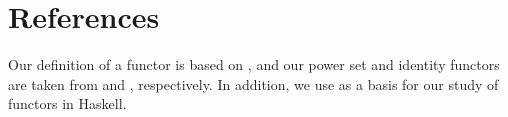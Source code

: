 \section{References}
\label{sec:functors-references}

Our definition of a functor is based on
\parencites[13]{maclane-1998}[428]{poigne-1992}, and our power set and
identity functors are taken from \parencites[431]{poigne-1992} and
\parencite[11]{marquis-2013}, respectively. In addition, we use
\parencites[146--150, 218--227]{lipovaca-2011}[18--23]{yorgey-2009} as
a basis for our study of functors in Haskell.


\clearemptydoublepage
